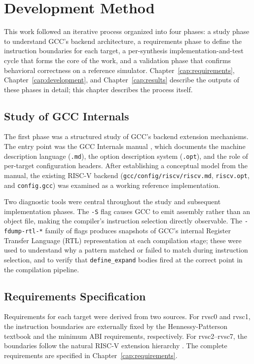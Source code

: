 \chapter{Development Method} \label{cap:method}

This work followed an iterative process organized into four phases: a study phase to understand GCC's
backend architecture, a requirements phase to define the instruction boundaries for each target, a
per-synthesis implementation-and-test cycle that forms the core of the work, and a validation phase
that confirms behavioral correctness on a reference simulator. Chapter~\ref{cap:requirements},
Chapter~\ref{cap:development}, and Chapter~\ref{cap:results} describe the outputs of these phases in
detail; this chapter describes the process itself.

\section{Study of GCC Internals}

The first phase was a structured study of GCC's backend extension mechanisms. The entry point was the
GCC Internals manual \cite{gcc-internals}, which documents the machine description language
(\texttt{.md}), the option description system (\texttt{.opt}), and the role of per-target
configuration headers. After establishing a conceptual model from the manual, the existing RISC-V
backend (\texttt{gcc/config/riscv/riscv.md}, \texttt{riscv.opt}, and \texttt{config.gcc}) was
examined as a working reference implementation.

Two diagnostic tools were central throughout the study and subsequent implementation phases. The
\texttt{-S} flag causes GCC to emit assembly rather than an object file, making the compiler's
instruction selection directly observable. The \texttt{-fdump-rtl-*} family of flags produces
snapshots of GCC's internal Register Transfer Language (RTL) representation at each compilation
stage; these were used to understand why a pattern matched or failed to match during instruction
selection, and to verify that \texttt{define\_expand} bodies fired at the correct point in the
compilation pipeline.

\section{Requirements Specification}

Requirements for each target were derived from two sources. For rvsc0 and rvsc1, the instruction
boundaries are externally fixed by the Hennessy-Patterson textbook \cite{patterson2020} and the
minimum ABI requirements, respectively. For rvsc2--rvsc7, the boundaries follow the natural RISC-V
extension hierarchy \cite{riscv-spec}. The complete requirements are specified in
Chapter~\ref{cap:requirements}.

